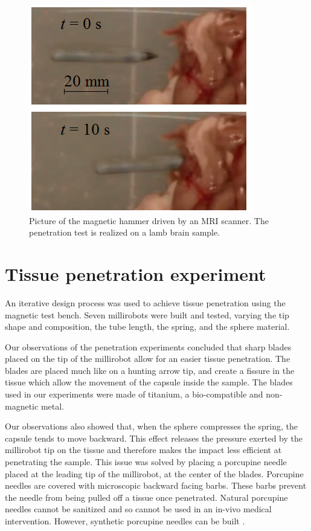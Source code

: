 \documentclass[letterpaper, 10 pt, conference]{ieeeconf}  %
\begin{document}
\begin{figure}
\centering
  \includegraphics[width=120 pt]{tests_in_MRI.png}
  \caption{Picture of the magnetic hammer driven by an MRI scanner. The penetration test is realized on a lamb brain sample.}
  \label{MRI_test}
	\vspace{-2em}
\end{figure}

\section{Tissue penetration experiment}

An iterative design process was used to achieve tissue penetration using the magnetic test bench. Seven millirobots were built and tested, varying the tip shape and composition, the tube length, the spring, and the sphere material. \par
Our observations of the penetration experiments concluded that sharp blades placed on the tip of the millirobot allow for an easier tissue penetration. The blades are placed much like on a hunting arrow tip, and create a fissure in the tissue which allow the movement of the capsule inside the sample. The blades used in our experiments were made of titanium, a bio-compatible and non-magnetic metal.\par
Our observations also showed that, when the sphere compresses the spring, the capsule tends to move backward. This effect releases the pressure exerted by the millirobot tip on the tissue and therefore makes the impact less efficient at penetrating the sample. This issue was solved by placing a porcupine needle placed at the leading tip of the millirobot, at the center of the blades. Porcupine needles are covered with microscopic backward facing barbs. These barbs prevent the needle from being pulled off a tissue once penetrated. Natural porcupine needles cannot be sanitized and so cannot be used in an in-vivo medical intervention. However, synthetic porcupine needles can be built \cite{cho2012microstructured}.\par
\end{document}
